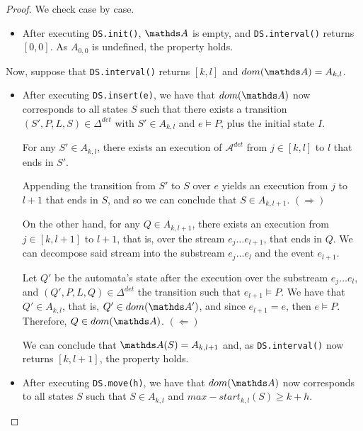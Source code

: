 \begin{proof} We check case by case.

\begin{itemize}

\item After executing \texttt{DS.init()}, $\dsA$ is empty, and \texttt{DS.interval()} returns $[0,0]$. As $A_{0,0}$ is undefined, the property holds.

\end{itemize}

Now, suppose that \texttt{DS.interval()} returns $[k,l]$ and $dom(\dsA) = A_{k,l}$.

\begin{itemize}

\item After executing \texttt{DS.insert(e)}, we have that $dom(\dsA)$ now corresponds to all states $S$ such that there exists a transition $(S',P,L,S)\in\Delta^{det}$ with $S' \in A_{k,l}$ and $e\vDash P$, 
plus the initial state $I$.

For any $S'\in A_{k,l}$,  
there exists an execution of $\mathcal{A}^{det}$ from $j\in[k,l]$ to $l$ that ends in $S'$. 

Appending the transition from $S'$ to $S$ over $e$ yields an execution from $j$ to $l+1$ that ends in $S$, and so we can conclude that $S\in A_{k,l+1}$. $(\Rightarrow)$

On the other hand, for any $Q\in A_{k,l+1}$, there exists an execution from $j\in[k,l+1]$ to $l+1$, that is, over the stream $e_j\dots e_{l+1}$, that ends in $Q$. We can decompose said stream into the substream $e_j\dots e_l$ and the event $e_{l+1}$. 

Let $Q'$ be the automata's state after the %
execution over the substream $e_j\dots e_l$, and $(Q',P,L,Q)\in\Delta^{det}$ the %
transition such that $e_{l+1}\vDash P$. We have that $Q'\in A_{k,l}$, that is, $Q'\in dom(\dsA')$, and since $e_{l+1} = e$, then $e\vDash P$. Therefore, $Q\in dom(\dsA)$.  $(\Leftarrow)$

We can conclude that $\dsA(S) = A_{k,l+1}$ and, as \texttt{DS.interval()} now returns $[k,l+1]$, the property holds.

\item After executing \texttt{DS.move(h)}, we have that $dom(\dsA)$ now corresponds to all states $S$ such that
$S\in A_{k,l}$ and $max-start_{k,l}(S) \geq k+h$.


\end{itemize}
\end{proof}

